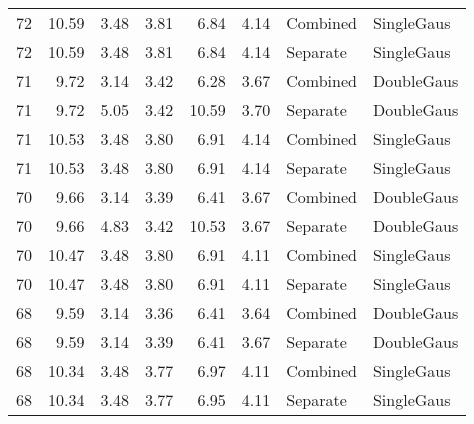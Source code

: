 \documentclass[11pt, letterpaper]{article}
\begin{document}
\begin{tabular}{lrrrrrll}
 72   &                       10.59 &               3.48 &                         3.81 &              6.84 &               4.14 & Combined & SingleGaus \\
 72   &                       10.59 &               3.48 &                         3.81 &              6.84 &               4.14 & Separate & SingleGaus \\
 71   &                        9.72 &               3.14 &                         3.42 &              6.28 &               3.67 & Combined & DoubleGaus \\
 71   &                        9.72 &               5.05 &                         3.42 &             10.59 &               3.70 & Separate & DoubleGaus \\
 71   &                       10.53 &               3.48 &                         3.80 &              6.91 &               4.14 & Combined & SingleGaus \\
 71   &                       10.53 &               3.48 &                         3.80 &              6.91 &               4.14 & Separate & SingleGaus \\
 70   &                        9.66 &               3.14 &                         3.39 &              6.41 &               3.67 & Combined & DoubleGaus \\
 70   &                        9.66 &               4.83 &                         3.42 &             10.53 &               3.67 & Separate & DoubleGaus \\
 70   &                       10.47 &               3.48 &                         3.80 &              6.91 &               4.11 & Combined & SingleGaus \\
 70   &                       10.47 &               3.48 &                         3.80 &              6.91 &               4.11 & Separate & SingleGaus \\
 68   &                        9.59 &               3.14 &                         3.36 &              6.41 &               3.64 & Combined & DoubleGaus \\
 68   &                        9.59 &               3.14 &                         3.39 &              6.41 &               3.67 & Separate & DoubleGaus \\
 68   &                       10.34 &               3.48 &                         3.77 &              6.97 &               4.11 & Combined & SingleGaus \\
 68   &                       10.34 &               3.48 &                         3.77 &              6.95 &               4.11 & Separate & SingleGaus \\

\end{tabular}
\end{document}
